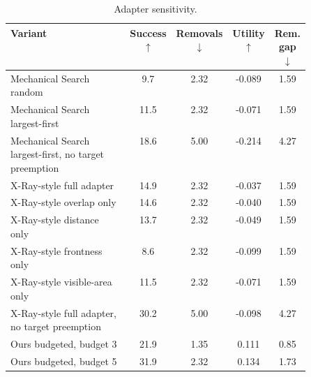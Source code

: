 \begin{table}[htbp]
  \centering
  \caption{Adapter sensitivity.}
  \label{tab:stage3_prior_adapter_sensitivity}
  \small
  \setlength{\tabcolsep}{4.5pt}
  \begin{tabular}{>{\centering\arraybackslash}p{0.50\linewidth}cccc}
    \toprule
    Variant & Success $\uparrow$ & Removals $\downarrow$ & Utility $\uparrow$ & Rem. gap $\downarrow$ \\
    \midrule
    Mechanical Search random & 9.7 & 2.32 & -0.089 & 1.59 \\
    Mechanical Search largest-first & 11.5 & 2.32 & -0.071 & 1.59 \\
    Mechanical Search largest-first, no target preemption & 18.6 & 5.00 & -0.214 & 4.27 \\
    X-Ray-style full adapter & 14.9 & 2.32 & -0.037 & 1.59 \\
    X-Ray-style overlap only & 14.6 & 2.32 & -0.040 & 1.59 \\
    X-Ray-style distance only & 13.7 & 2.32 & -0.049 & 1.59 \\
    X-Ray-style frontness only & 8.6 & 2.32 & -0.099 & 1.59 \\
    X-Ray-style visible-area only & 11.5 & 2.32 & -0.071 & 1.59 \\
    X-Ray-style full adapter, no target preemption & 30.2 & 5.00 & -0.098 & 4.27 \\
    Ours budgeted, budget 3 & 21.9 & 1.35 & 0.111 & 0.85 \\
    Ours budgeted, budget 5 & 31.9 & 2.32 & 0.134 & 1.73 \\
    \bottomrule
  \end{tabular}
  \vspace{2pt}
  \begin{minipage}{\linewidth}
    
  \end{minipage}
\end{table}
